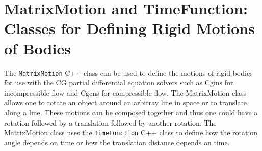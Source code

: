% 
% 
% 
% 
% 
% 
% 
% 
% 

\section{MatrixMotion and TimeFunction: Classes for Defining Rigid Motions of Bodies}\label{sec:matrixMotion}


   The {\tt MatrixMotion} C++ class can be used to define the motions of rigid bodies for use with the
CG partial differential equation solvers such as Cgins for incompressible flow and Cgcns for compressible flow. 
The MatrixMotion class allows one to rotate an object around an arbitray line in space 
or to translate along a line. These motions can be composed together and thus one could
have a rotation followed by a translation followed by another rotation. The MatrixMotion
class uses the {\tt TimeFunction} C++ class to define how the rotation angle depends on time or how
the translation distance depends on time. 

